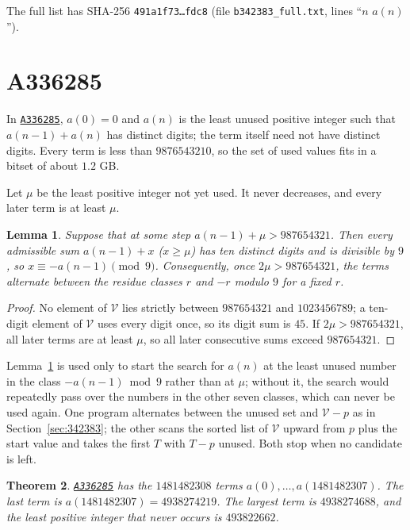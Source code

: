 \documentclass[11pt,a4paper]{article}
\newtheorem{theorem}{Theorem}
\newtheorem{lemma}[theorem]{Lemma}
\theoremstyle{remark}
\newcommand{\oeis}[1]{\href{https://oeis.org/#1}{\texttt{#1}}}
\begin{document}
The full list has SHA-256 \texttt{491a1f73\ldots fdc8} (file \texttt{b342383\_full.txt}, lines ``$n$ $a(n)$'').

\section{A336285}\label{sec:336285}

In \oeis{A336285}, $a(0)=0$ and $a(n)$ is the least unused positive integer such that $a(n-1)+a(n)$ has distinct digits; the term itself need not have distinct digits. Every term is less than $9876543210$, so the set of used values fits in a bitset of about $1.2$ GB.

Let $\mu$ be the least positive integer not yet used. It never decreases, and every later term is at least $\mu$.

\begin{lemma}\label{lem:mod9}
Suppose that at some step $a(n-1)+\mu>987654321$. Then every admissible sum $a(n-1)+x$ ($x\ge\mu$) has ten distinct digits and is divisible by $9$, so $x\equiv-a(n-1)\pmod 9$. Consequently, once $2\mu>987654321$, the terms alternate between the residue classes $r$ and $-r$ modulo $9$ for a fixed $r$.
\end{lemma}

\begin{proof}
No element of $\mathcal V$ lies strictly between $987654321$ and $1023456789$; a ten-digit element of $\mathcal V$ uses every digit once, so its digit sum is $45$. If $2\mu>987654321$, all later terms are at least $\mu$, so all later consecutive sums exceed $987654321$.
\end{proof}

Lemma~\ref{lem:mod9} is used only to start the search for $a(n)$ at the least unused number in the class $-a(n-1)\bmod 9$ rather than at $\mu$; without it, the search would repeatedly pass over the numbers in the other seven classes, which can never be used again. One program alternates between the unused set and $\mathcal V-p$ as in Section~\ref{sec:342383}; the other scans the sorted list of $\mathcal V$ upward from $p$ plus the start value and takes the first $T$ with $T-p$ unused. Both stop when no candidate is left.

\begin{theorem}
\oeis{A336285} has the $1481482308$ terms $a(0),\dots,a(1481482307)$. The last term is $a(1481482307)=4938274219$. The largest term is $4938274688$, and the least positive integer that never occurs is $493822662$.
\end{theorem}
\end{document}
